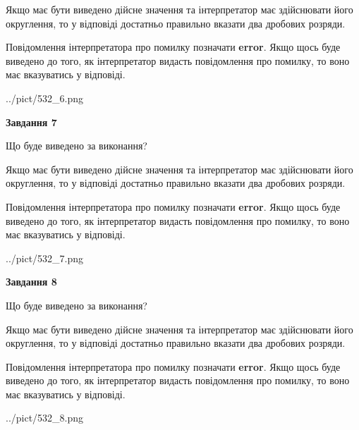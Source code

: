 \documentclass[12pt, ukrainian]{article}
\begin{document}
{\begin {Large}
Якщо має бути виведено дійсне значення та інтерпретатор має здійснювати його округлення, 
то у відповіді достатньо правильно вказати два дробових розряди.

Повідомлення інтерпретатора про помилку позначати \textbf{error}.
Якщо щось буде виведено до того, як інтерпретатор видасть повідомлення про помилку, 
то воно має вказуватись у відповіді. \par

\begin{center}
	{../pict/532_6.png}
\end{center}
\newpage

{\begin {center}\textbf{Завдання 7}\end {center}}\par
Що буде виведено за виконання? \par

Якщо має бути виведено дійсне значення та інтерпретатор має здійснювати його округлення, 
то у відповіді достатньо правильно вказати два дробових розряди.

Повідомлення інтерпретатора про помилку позначати \textbf{error}.
Якщо щось буде виведено до того, як інтерпретатор видасть повідомлення про помилку, 
то воно має вказуватись у відповіді. \par

\begin{center}
	{../pict/532_7.png}
\end{center}
\newpage

{\begin {center}\textbf{Завдання 8}\end {center}}\par
Що буде виведено за виконання? \par

Якщо має бути виведено дійсне значення та інтерпретатор має здійснювати його округлення, 
то у відповіді достатньо правильно вказати два дробових розряди.

Повідомлення інтерпретатора про помилку позначати \textbf{error}.
Якщо щось буде виведено до того, як інтерпретатор видасть повідомлення про помилку, 
то воно має вказуватись у відповіді. \par

\begin{center}
	{../pict/532_8.png}
\end{center}
\newpage


\end{Large}}
\end{document}
